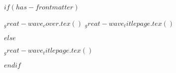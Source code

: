 $if(has-frontmatter)$
  \begin{frontmatter}
    \begin{titlepage}
      $_great-wave_cover.tex()$
      $_great-wave_titlepage.tex()$
    \end{titlepage}
    \setcounter{page}{1}
  \end{frontmatter}
$else$
  \begin{titlepage}
    $_great-wave_titlepage.tex()$
  \end{titlepage}
$endif$
